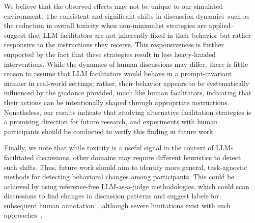We believe that the observed effects may not be unique to our simulated environment. The consistent and significant shifts in discussion dynamics--such as the reduction in overall toxicity when non-minimalist strategies are applied--suggest that LLM facilitators are not inherently fixed in their behavior but rather responsive to the instructions they receive. This responsiveness is further supported by the fact that these strategies result in less heavy-handed interventions. While the dynamics of human discussions may differ, there is little reason to assume that LLM facilitators would behave in a prompt-invariant manner in real-world settings; rather, their behavior appears to be systematically influenced by the guidance provided, much like human facilitators, indicating that their actions can be intentionally shaped through appropriate instructions. Nonetheless, our results indicate that studying alternative facilitation strategies is a promising direction for future research, and experiments with human participants should be conducted to verify this finding in future work.

Finally, we note that while toxicity is a useful signal in the context of LLM-facilitated discussions, other domains may require different heuristics to detect such shifts. Thus, future work should aim to identify more general, task-agnostic methods for detecting behavioral changes among participants. This could be achieved by using reference-free LLM-as-a-judge methodologies, which could scan discussions to find changes in discussion patterns and suggest labels for subsequent human annotation~\cite{zhang2023llmaaa}, although severe limitations exist with such approaches~\cite{krumdick2025no}. 


